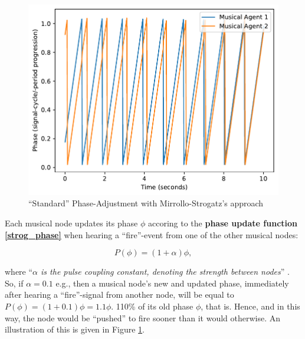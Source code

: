 			
			\begin{figure}[h]
				\centering
				\includegraphics[width=0.9\linewidth]{Assets/Figures/MirolloStrogatzPhaseAdjustment.pdf}
				\caption{``Standard'' Phase-Adjustment with Mirrollo-Strogatz's approach}
				\label{fig:strog_phase}
			\end{figure}
			
			Each musical node updates its phase $\phi$ accoring to the \textbf{phase update function \eqref{strog_phase}} when hearing a ``fire''-event from one of the other musical nodes:
			
			\begin{equation}\label{strog_phase}
			P(\phi) = (1 + \alpha)\phi	,
			\end{equation}
			
			where ``\textit{$\alpha$ is the pulse coupling constant, denoting the strength between nodes}'' \cite{nymoen_synch}. So, if $\alpha = 0.1$ e.g., then a musical node's new and updated phase, immediately after hearing a ``fire''-signal from another node, will be equal to $P(\phi) = (1 + 0.1)\phi = 1.1\phi$. 110\% of its old phase $\phi$, that is. Hence, and in this way, the node would be ``pushed'' to fire sooner than it would otherwise. An illustration of this is given in Figure \ref{fig:strog_phase}.
			
			
			
